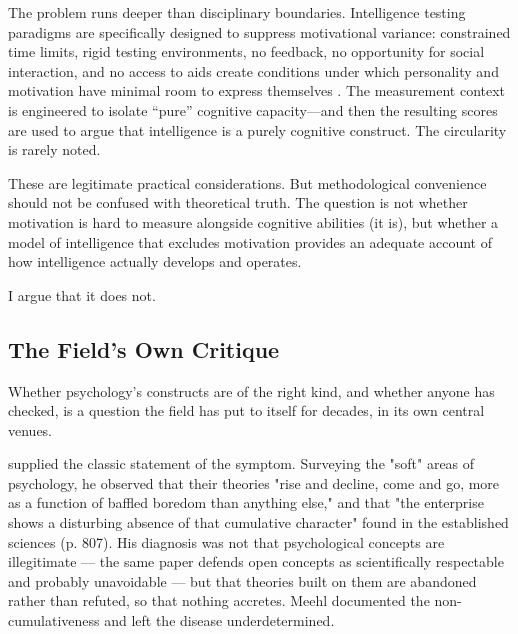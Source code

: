 \documentclass[12pt,a4paper]{article}
\begin{document}
The problem runs deeper than disciplinary boundaries. Intelligence testing paradigms are specifically designed to suppress motivational variance: constrained time limits, rigid testing environments, no feedback, no opportunity for social interaction, and no access to aids create conditions under which personality and motivation have minimal room to express themselves \citep{Ackerman2018}. The measurement context is engineered to isolate ``pure'' cognitive capacity---\hspace{0pt}and then the resulting scores are used to argue that intelligence is a purely cognitive construct. The circularity is rarely noted.

These are legitimate practical considerations. But methodological convenience should not be confused with theoretical truth. The question is not whether motivation is hard to measure alongside cognitive abilities (it is), but whether a model of intelligence that excludes motivation provides an adequate account of how intelligence actually develops and operates.

I argue that it does not.


\subsection{The Field's Own Critique}

Whether psychology's constructs are of the right kind, and whether anyone has checked, is a question the field has put to itself for decades, in its own central venues.

\citet{Meehl1978} supplied the classic statement of the symptom. Surveying the "soft" areas of psychology, he observed that their theories "rise and decline, come and go, more as a function of baffled boredom than anything else," and that "the enterprise shows a disturbing absence of that cumulative character" found in the established sciences (p. 807). His diagnosis was not that psychological concepts are illegitimate ---\hspace{0pt} the same paper defends open concepts as scientifically respectable and probably unavoidable ---\hspace{0pt} but that theories built on them are abandoned rather than refuted, so that nothing accretes. Meehl documented the non-cumulativeness and left the disease underdetermined.
\end{document}

